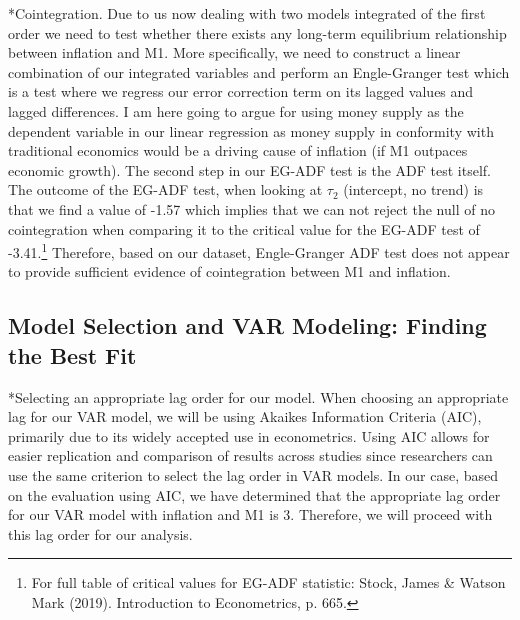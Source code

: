 \documentclass{article}
\makeatletter
\renewcommand{\paragraph}{\@startsection{paragraph}{4}{\z@}{3.25ex \@plus 1ex \@minus .2ex}{-1em}{\color{mydarkblue}\normalfont\small\bfseries}}
\makeatother
\begin{document}
        \paragraph*{Cointegration.}
        Due to us now dealing with two models integrated of the first order we need to test whether there 
        exists any long-term equilibrium relationship between inflation and M1. More specifically, we need 
        to construct a linear combination of our integrated variables and perform an Engle-Granger test 
        which is a test where we regress our error correction term on its lagged values and lagged 
        differences. I am here going to argue for using money supply as the dependent variable in our 
        linear regression as money supply in conformity with traditional economics would be a driving 
        cause of inflation (if M1 outpaces economic growth). The second step in our EG-ADF test is the ADF 
        test itself. The outcome of the EG-ADF test, when looking at $\tau_2$ (intercept, no trend) is that 
        we find a value of -1.57 which implies that we can not reject the null of no cointegration when comparing 
        it to the critical value for the EG-ADF test of -3.41.\footnote{For full table of critical values for 
        EG-ADF statistic: Stock, James \& Watson Mark (2019). Introduction to Econometrics, p. 665.} 
        Therefore, based on our dataset, Engle-Granger ADF test does not appear to provide sufficient 
        evidence of cointegration between M1 and inflation.

    
    \subsection*{Model Selection and VAR Modeling: Finding the Best Fit}
        \paragraph*{Selecting an appropriate lag order for our model.}
        When choosing an appropriate lag for our VAR model, we will be using Akaikes Information Criteria (AIC),
        primarily due to its widely accepted use in econometrics. Using AIC allows for easier replication and 
        comparison of results across studies since researchers can use the same criterion to select the lag 
        order in VAR models. In our case, based on the evaluation using AIC, we have determined that the 
        appropriate lag order for our VAR model with inflation and M1 is 3. Therefore, we will proceed with this 
        lag order for our analysis.
\end{document}
